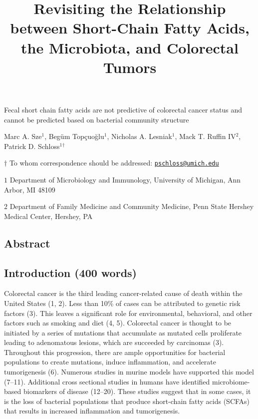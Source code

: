 \documentclass[11pt,]{article}
\title{Revisiting the Relationship between Short-Chain Fatty Acids, the
Microbiota, and Colorectal Tumors}
\author{}
\date{}
\begin{document}
\maketitle

\vspace{35mm}

Fecal short chain fatty acids are not predictive of colorectal cancer
status and cannot be predicted based on bacterial community structure

\vspace{35mm}

Marc A. Sze\({^1}\), Begüm Topçuoğlu\({^1}\), Nicholas A.
Lesniak\({^1}\), Mack T. Ruffin IV\({^2}\), Patrick D.
Schloss\({^1}\)\({^\dagger}\)

\vspace{40mm}

\(\dagger\) To whom correspondence should be addressed:
\href{mailto:pschloss@umich.edu}{\nolinkurl{pschloss@umich.edu}}

\(1\) Department of Microbiology and Immunology, University of Michigan,
Ann Arbor, MI 48109

\(2\) Department of Family Medicine and Community Medicine, Penn State
Hershey Medical Center, Hershey, PA

\newpage
\linenumbers

\hypertarget{abstract}{%
\subsection{Abstract}\label{abstract}}

\newpage

\hypertarget{introduction-400-words}{%
\subsection{Introduction (400 words)}\label{introduction-400-words}}

Colorectal cancer is the third leading cancer-related cause of death
within the United States (1, 2). Less than 10\% of cases can be
attributed to genetic risk factors (3). This leaves a significant role
for environmental, behavioral, and other factors such as smoking and
diet (4, 5). Colorectal cancer is thought to be initiated by a series of
mutations that accumulate as mutated cells proliferate leading to
adenomatous lesions, which are succeeded by carcinomas (3). Throughout
this progression, there are ample opportunities for bacterial
populations to create mutations, induce inflammation, and accelerate
tumorigenesis (6). Numerous studies in murine models have supported this
model (7--11). Additional cross sectional studies in humans have
identified microbiome-based biomarkers of disease (12--20). These
studies suggest that in some cases, it is the loss of bacterial
populations that produce short-chain fatty acids (SCFAs) that results in
increased inflammation and tumorigenesis.
\end{document}
